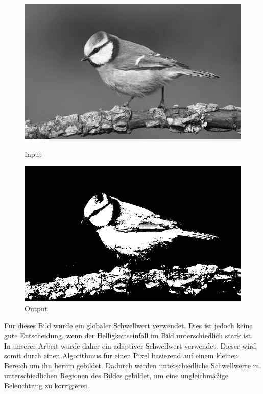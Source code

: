\begin{figure}[htb]
    \centering
    \begin{minipage}[t]{0.45\linewidth}
        \centering
        \includegraphics[width=\linewidth]{pics/bildverarbeitungsalgos/grayscaling_output.png}
        \caption{Input}
        \label{maai:thresholding:input:second}
    \end{minipage}
    \hfill
    \begin{minipage}[t]{0.45\linewidth}
        \centering
        \includegraphics[width=\linewidth]{pics/bildverarbeitungsalgos/thresholding_output.png}
        \caption{Output}
        \label{maai:thresholding:output}
    \end{minipage}
\end{figure}


Für dieses Bild wurde ein globaler Schwellwert verwendet. Dies ist jedoch keine gute Entscheidung, wenn der Helligkeitseinfall im Bild unterschiedlich stark ist. In unserer Arbeit wurde daher ein adaptiver Schwellwert verwendet. Dieser wird somit durch einen Algorithmus für einen Pixel basierend auf einem kleinen Bereich um ihn herum gebildet. Dadurch werden unterschiedliche Schwellwerte in unterschiedlichen Regionen des Bildes gebildet, um eine ungleichmäßige Beleuchtung zu korrigieren.

